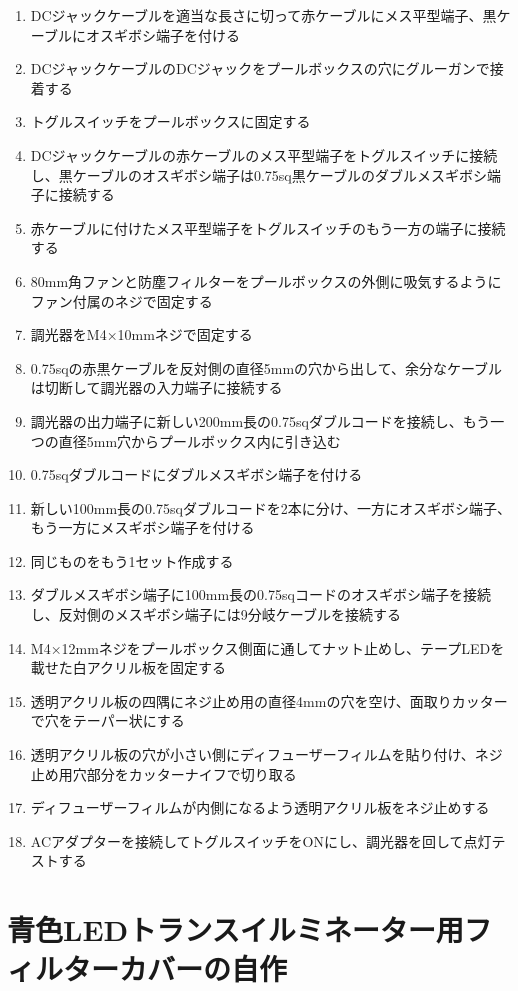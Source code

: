 \documentclass[titlepage,10pt,a4paper,uplatex]{jsbook}
\begin{document}
\begin{enumerate}
\item DCジャックケーブルを適当な長さに切って赤ケーブルにメス平型端子、黒ケーブルにオスギボシ端子を付ける
\item DCジャックケーブルのDCジャックをプールボックスの穴にグルーガンで接着する
\item トグルスイッチをプールボックスに固定する
\item DCジャックケーブルの赤ケーブルのメス平型端子をトグルスイッチに接続し、黒ケーブルのオスギボシ端子は0.75sq黒ケーブルのダブルメスギボシ端子に接続する
\item 赤ケーブルに付けたメス平型端子をトグルスイッチのもう一方の端子に接続する
\item 80mm角ファンと防塵フィルターをプールボックスの外側に吸気するようにファン付属のネジで固定する
\item 調光器をM4×10mmネジで固定する
\item 0.75sqの赤黒ケーブルを反対側の直径5mmの穴から出して、余分なケーブルは切断して調光器の入力端子に接続する
\item 調光器の出力端子に新しい200mm長の0.75sqダブルコードを接続し、もう一つの直径5mm穴からプールボックス内に引き込む
\item 0.75sqダブルコードにダブルメスギボシ端子を付ける
\item 新しい100mm長の0.75sqダブルコードを2本に分け、一方にオスギボシ端子、もう一方にメスギボシ端子を付ける
\item 同じものをもう1セット作成する
\item ダブルメスギボシ端子に100mm長の0.75sqコードのオスギボシ端子を接続し、反対側のメスギボシ端子には9分岐ケーブルを接続する
\item M4×12mmネジをプールボックス側面に通してナット止めし、テープLEDを載せた白アクリル板を固定する
\item 透明アクリル板の四隅にネジ止め用の直径4mmの穴を空け、面取りカッターで穴をテーパー状にする
\item 透明アクリル板の穴が小さい側にディフューザーフィルムを貼り付け、ネジ止め用穴部分をカッターナイフで切り取る
\item ディフューザーフィルムが内側になるよう透明アクリル板をネジ止めする
\item ACアダプターを接続してトグルスイッチをONにし、調光器を回して点灯テストする
\end{enumerate}

\section{青色LEDトランスイルミネーター用フィルターカバーの自作}\label{makingfiltercover}
\end{document}
